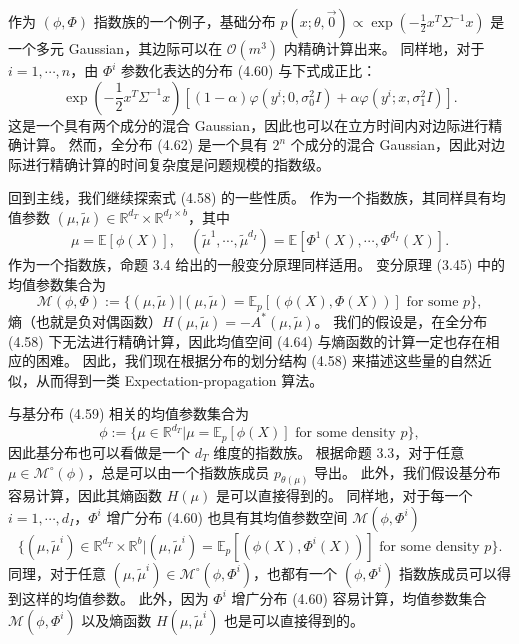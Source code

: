 \begin{tcolorbox}
\begin{exam}
作为 $(\phi, \Phi)$ 指数族的一个例子，基础分布 $p(x; \theta, \vec{0}) \propto \exp(-\frac{1}{2}x^T\Sigma^{-1}x)$ 是一个多元 Gaussian，其边际可以在 $\mathcal{O}(m^3)$ 内精确计算出来。
同样地，对于 $i = 1, \cdots, n$，由 $\Phi^i$ 参数化表达的分布 (4.60) 与下式成正比：
\begin{equation}
    \exp(-\frac{1}{2}x^T\Sigma^{-1}x)[(1-\alpha)\varphi(y^i; 0, \sigma_0^2I)+\alpha\varphi(y^i; x, \sigma_1^2I)].
\end{equation}
这是一个具有两个成分的混合 Gaussian，因此也可以在立方时间内对边际进行精确计算。
然而，全分布 (4.62) 是一个具有 $2^n$ 个成分的混合 Gaussian，因此对边际进行精确计算的时间复杂度是问题规模的指数级。

\end{exam}
\end{tcolorbox}

回到主线，我们继续探索式 (4.58) 的一些性质。
作为一个指数族，其同样具有均值参数 $(\mu, \tilde{\mu}) \in \mathbb{R}^{d_T}\times\mathbb{R}^{d_I\times b}$，其中
\begin{equation*}
    \mu = \mathbb{E}[\phi(X)], \quad (\tilde{\mu}^1, \cdots, \tilde{\mu}^{d_I}) = \mathbb{E}[\Phi^1(X), \cdots, \Phi^{d_I}(X)].
\end{equation*}
作为一个指数族，命题 3.4 给出的一般变分原理同样适用。
变分原理 (3.45) 中的均值参数集合为
\begin{equation}
    \mathcal{M}(\phi, \Phi) := \{(\mu, \tilde{\mu})|(\mu, \tilde{\mu}) = \mathbb{E}_p[(\phi(X), \Phi(X))] \text{ for some } p\}, 
\end{equation}
熵（也就是负对偶函数）$H(\mu, \tilde{\mu}) = -A^*(\mu, \tilde{\mu})$。
我们的假设是，在全分布 (4.58) 下无法进行精确计算，因此均值空间 (4.64) 与熵函数的计算一定也存在相应的困难。
因此，我们现在根据分布的划分结构 (4.58) 来描述这些量的自然近似，从而得到一类 Expectation-propagation 算法。

与基分布 (4.59) 相关的均值参数集合为
\begin{equation}
    \mathcal{\phi} := \{\mu \in \mathbb{R}^{d_T}|\mu = \mathbb{E}_p[\phi(X)] \text{ for some density } p\}, 
\end{equation}
因此基分布也可以看做是一个 $d_T$ 维度的指数族。
根据命题 3.3，对于任意 $\mu \in \mathcal{M}^\circ(\phi)$，总是可以由一个指数族成员 $p_{\theta(\mu)}$ 导出。
此外，我们假设基分布容易计算，因此其熵函数 $H(\mu)$ 是可以直接得到的。
同样地，对于每一个 $i = 1, \cdots, d_I$，$\Phi^i$ 增广分布 (4.60) 也具有其均值参数空间 $\mathcal{M}(\phi, \Phi^i)$
\begin{equation}
    \{(\mu, \tilde{\mu}^i) \in \mathbb{R}^{d_T}\times\mathbb{R}^b| (\mu, \tilde{\mu}^i) = \mathbb{E}_p[(\phi(X), \Phi^i(X))] \text{ for some density } p\}.
\end{equation}
同理，对于任意 $(\mu, \tilde{\mu}^i) \in \mathcal{M}^\circ(\phi, \Phi^i)$，也都有一个 $(\phi, \Phi^i)$ 指数族成员可以得到这样的均值参数。
此外，因为 $\Phi^i$ 增广分布 (4.60) 容易计算，均值参数集合 $\mathcal{M}(\phi, \Phi^i)$ 以及熵函数 $H(\mu, \tilde{\mu}^i)$ 也是可以直接得到的。

